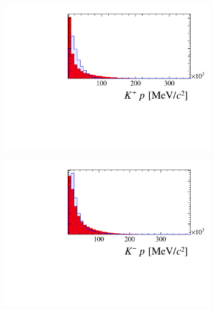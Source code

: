 \begin{figure}[!h]
\begin{subfigure}[t]{0.22\textwidth}
   \end{subfigure}
   \begin{subfigure}[t]{0.22\textwidth}
      \centering
      \includegraphics[width=1.0\textwidth]{figs/Selection/Ds_BDT_Var_Ds2KKPi_D_K0_P.pdf}
   \end{subfigure}
   \begin{subfigure}[t]{0.22\textwidth}
      \centering
      \includegraphics[width=1.0\textwidth]{figs/Selection/Ds_BDT_Var_Ds2KKPi_D_K1_P.pdf}
   \end{subfigure}
   \begin{subfigure}[t]{0.22\textwidth}
      \centering

\end{subfigure}
\end{figure}
